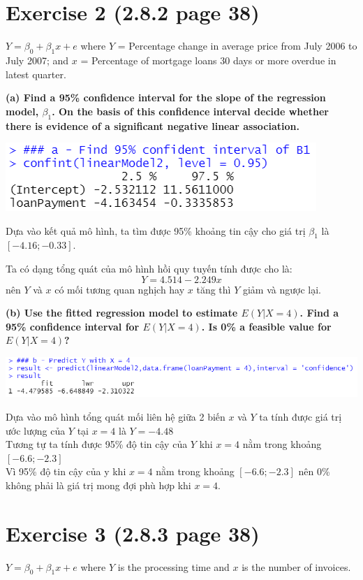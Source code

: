 \documentclass[a4paper]{article}
\theoremstyle{nonumberplain}
\begin{document}
\section*{Exercise 2 (2.8.2 page 38)}
$Y = \beta_0 + \beta_1 x + e$ where 
$Y$ = Percentage change in average price from July 2006 to July 2007; and $x$ = Percentage of mortgage loans 30 days or more overdue in latest quarter.

\textbf{(a) Find a 95\% confidence interval for the slope of the regression model, $\beta_1$. On the basis of this confidence interval decide whether there is evidence of a significant negative linear association.}
\begin{center}
\includegraphics[scale = 0.8]{2a.PNG} 
\end{center}
Dựa vào kết quả mô hình, ta tìm được 95\% khoảng tin cậy cho giá trị $\beta_1$ là   $[-4.16;-0.33]$.

Ta có dạng tổng quát của mô hình hồi quy tuyến tính được cho là: $$Y = 4.514 - 2.249x$$ nên $Y$ và $x$ có mối tương quan nghịch hay $x$ tăng thì $Y$ giảm và ngược lại.

\textbf{(b) Use the fitted regression model to estimate $E(Y |X=4)$. Find a 95\% confidence interval for $E(Y |X=4)$. Is 0\% a feasible value for $E (Y |X=4)$?}

\begin{center}
\includegraphics[scale = 0.8]{2b.PNG} 
\end{center}

Dựa vào mô hình tổng quát mối liên hệ giữa 2 biến $x$ và $Y$ ta tính được giá trị ước lượng của $Y$ tại $ x = 4$   là $Y = -4.48$\\
Tương tự ta tính được 95\% độ tin cậy của $Y$ khi  $x = 4$ nằm trong khoảng $[-6.6;-2.3] $\\
Vì 95\% độ tin cậy của y khi $x = 4$ nằm trong khoảng  $[-6.6;-2.3]$ nên 0\% không phải là giá trị mong đợi phù hợp khi $x = 4$.

\section*{Exercise 3 (2.8.3 page 38)}
$Y = \beta_0 + \beta_1 x + e$ where 
$Y$ is the processing time and $x$ is the
number of invoices.
\end{document}
